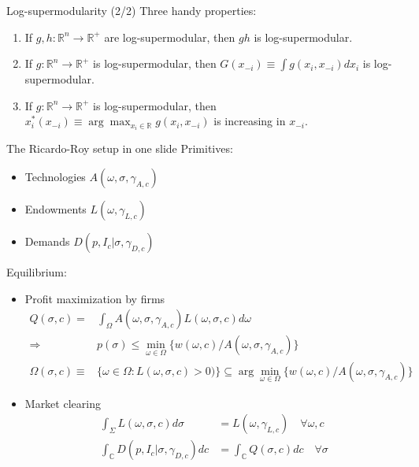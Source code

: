 \documentclass[10pt,notes=hide]{beamer}
\begin{document}
\begin{frame}{Log-supermodularity (2/2)}
Three handy properties:
\begin{enumerate}
\item If $g,h:\mathbb{R}^n\to\mathbb{R}^{+}$ are log-supermodular, then $gh$ is log-supermodular.
\item If $g:\mathbb{R}^n\to\mathbb{R}^{+}$ is log-supermodular, then $G(x_{-i})\equiv \int g(x_i,x_{-i})dx_i$ is log-supermodular.
\item If $g:\mathbb{R}^n\to\mathbb{R}^{+}$ is log-supermodular, then $x_i^* (x_{-i}) \equiv \arg\max_{x_i\in\mathbb{R}} g(x_i,x_{-i})$ is increasing in $x_{-i}$.
\end{enumerate}
\end{frame}
\begin{frame}{The Ricardo-Roy setup in one slide}
Primitives: 
\begin{itemize}
	\item Technologies $A(\omega,\sigma,\gamma_{A,c})$
	\item Endowments $L(\omega,\gamma_{L,c})$
	\item Demands $D(p,I_c\vert\sigma,\gamma_{D,c})$
\end{itemize}
Equilibrium:
\begin{itemize}
	\item Profit maximization by firms
\begin{align*}
Q(\sigma,c) =&\int_{\Omega} A(\omega,\sigma,\gamma_{A,c})L(\omega,\sigma,c)d\omega \\
\Rightarrow & p(\sigma) \leq \min_{\omega\in\Omega} \{w(\omega,c) / A(\omega,\sigma,\gamma_{A,c}) \} \\
 \Omega(\sigma,c) \equiv & \{\omega\in\Omega:L(\omega,\sigma,c)>0)\}  \subseteq \arg\min_{\omega\in\Omega} \{w(\omega,c) / A(\omega,\sigma,\gamma_{A,c}) \} 
\end{align*}
\item Market clearing
\begin{align*}
\int_{\Sigma} L(\omega,\sigma,c)d\sigma &= L(\omega,\gamma_{L,c}) \quad \forall \omega,c \\
\int_{\mathbb{C}} D(p,I_c\vert\sigma,\gamma_{D,c})dc  &= \int_{\mathbb{C}} Q(\sigma,c) dc \quad \forall \sigma
\end{align*}
\end{itemize}
\end{frame}
\end{document}
